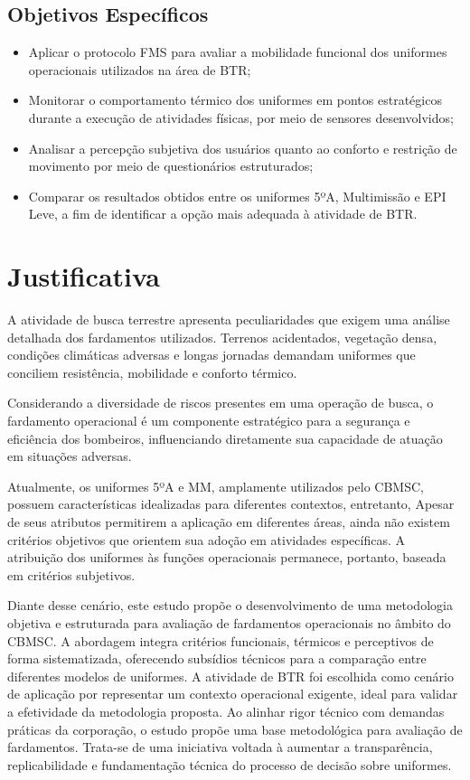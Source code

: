 		\subsection{Objetivos Específicos}
			\begin{itemize}
				\item Aplicar o protocolo \acrfull{FMS} para avaliar a mobilidade funcional dos uniformes operacionais utilizados na área de \acrlong{BTR};
				\item Monitorar o comportamento térmico dos uniformes em pontos estratégicos durante a execução de atividades físicas, por meio de sensores desenvolvidos;
				\item Analisar a percepção subjetiva dos usuários quanto ao conforto e restrição de movimento por meio de questionários estruturados;
				\item Comparar os resultados obtidos entre os uniformes 5ºA, Multimissão e \acrshort{EPI} Leve, a fim de identificar a opção mais adequada à atividade de \acrlong{BTR}.
			\end{itemize}

\section{Justificativa}
	
	A atividade de busca terrestre apresenta peculiaridades que exigem uma análise detalhada dos 
	fardamentos utilizados. Terrenos acidentados, vegetação densa, condições climáticas adversas 
	e longas jornadas demandam uniformes que conciliem resistência, mobilidade e conforto térmico.
	
	Considerando a diversidade de riscos presentes em uma operação de busca, o fardamento operacional é um componente estratégico para
	 a segurança e eficiência dos bombeiros, influenciando diretamente sua capacidade de atuação em situações adversas.
	
	Atualmente, os uniformes 5ºA e \acrlong{MM}, amplamente utilizados pelo \acrshort{CBMSC}, possuem 
	características idealizadas para diferentes contextos,
	  entretanto, Apesar de seus atributos permitirem a aplicação em diferentes áreas, ainda não existem critérios objetivos que 
	  orientem sua adoção em atividades específicas. A atribuição dos uniformes às funções operacionais 
	  permanece, portanto, baseada em critérios subjetivos.
	
	  Diante desse cenário, este estudo propõe o desenvolvimento de uma metodologia objetiva e estruturada
	   para avaliação de fardamentos operacionais no âmbito do \acrshort{CBMSC}. A abordagem integra 
	   critérios funcionais, térmicos e perceptivos de forma sistematizada, oferecendo subsídios técnicos para 
	   a comparação entre diferentes modelos de uniformes. A atividade de \acrlong{BTR} foi escolhida 
	   como cenário de aplicação por representar um contexto operacional exigente, ideal para validar a 
	   efetividade da metodologia proposta. Ao alinhar rigor técnico com demandas práticas da corporação, 
	   o estudo propõe uma base metodológica para avaliação de fardamentos. Trata-se de uma iniciativa 
	   voltada à aumentar a transparência, replicabilidade e fundamentação técnica do processo de decisão
	   sobre uniformes.
